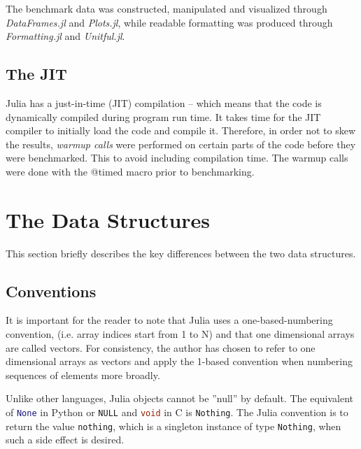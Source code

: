 \documentclass[a4paper, 11pt]{article}
\begin{document}
    The benchmark data was constructed, manipulated and visualized through
    \emph{DataFrames.jl} and \emph{Plots.jl}, while 
    readable formatting was produced through \emph{Formatting.jl} and \emph{Unitful.jl}. 

    \subsection*{The JIT}
    Julia has a just-in-time (JIT) compilation -- which means that the code is
    dynamically compiled during program run time.     
    It takes time for the JIT compiler to 
    initially load the code and compile it. Therefore, in order not to skew the
    results, \emph{warmup calls} were performed on certain parts of the code
    before they were benchmarked. This to avoid including 
    compilation time. The warmup calls were done with the @timed macro prior to
    benchmarking.

\clearpage

    \section*{The Data Structures}

    This section briefly describes the key differences between the two data
    structures. 
    
    \subsection*{Conventions}
    It is important for the reader to note that Julia uses a one-based-numbering
    convention, (i.e. array indices start from 1 to N) and that one dimensional
    arrays are called vectors. 
    For consistency, the author has chosen to refer to one dimensional
    arrays as vectors and apply the 1-based convention when numbering
    sequences of elements more broadly. 
    
    Unlike other languages, Julia objects cannot be ''null'' by default. The
    equivalent of \lstinline[language=Python]{None} in Python 
    or \lstinline[language=C]{NULL} and \lstinline[language=C]{void} in C is
    \texttt{Nothing}. The Julia convention is to return the value \texttt{nothing}, which is a
    singleton instance of type \texttt{Nothing}, when such a side effect is
    desired. 
\end{document}
